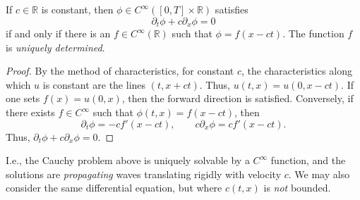 \documentclass{article}
\begin{document}
\begin{prop} If $c \in \mathbb{R}$ is constant, then $\phi \in C^{\infty}([0,T] \times \mathbb{R})$ satisfies 
\begin{equation*}
	\partial_{t}\phi + c\partial_{x}\phi = 0 
\end{equation*}
if and only if there is an $f \in C^{\infty}(\mathbb{R})$ such that $\phi = f(x - ct)$. The function $f$ is \textit{uniquely determined}. 
\end{prop} 
\begin{proof}
	By the method of characteristics, for constant $c$, the characteristics along which $u$ is constant are the lines $(t, x + ct)$. Thus, $u(t, x) = u(0,x - ct)$. If one sets $f(x) = u(0, x)$, then the forward direction is satisfied. Conversely, if there exists $f \in C^{\infty}$ such that $\phi(t, x) = f(x - ct)$, then 
	\begin{equation*}
		\partial_{t}\phi = -cf'(x - ct), \qquad c\partial_{x}\phi = cf'(x - ct). 
	\end{equation*} 
	Thus, $\partial_{t}\phi + c\partial_{x}\phi = 0$. 
\end{proof} 

I.e., the Cauchy problem above is uniquely solvable by a $C^{\infty}$ function, and the solutions are \textit{propagating} waves translating rigidly with velocity $c$. We may also consider the same differential equation, but where $c(t, x)$ is \textit{not} bounded. 
\end{document}
